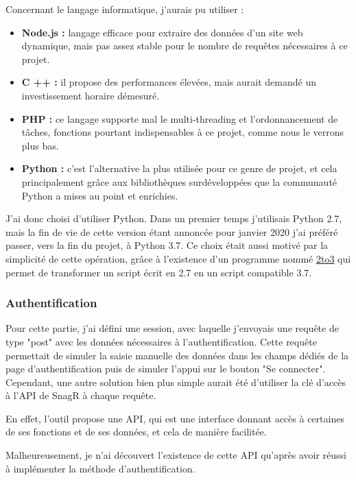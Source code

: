 Concernant le langage informatique, j'aurais pu utiliser :
\begin{itemize}
\item \textbf{Node.js :} langage efficace pour extraire des données d'un site web dynamique, mais pas assez stable pour le nombre de requêtes nécessaires à ce projet.
\item \textbf{C ++ :} il propose des performances élevées, mais aurait demandé un investissement horaire démesuré.
\item \textbf{PHP :} ce langage supporte mal le multi-threading et l'ordonnancement de tâches, fonctions pourtant indispensables à ce projet, comme nous le verrons plus bas.
\item \textbf{Python :} c'est l'alternative la plus utilisée pour ce genre de projet, et cela principalement grâce aux bibliothèques surdéveloppées que la communauté Python a mises au point et enrichies.
\end{itemize}

J'ai donc choisi d'utiliser Python. Dans un premier temps j'utilisais Python 2.7, mais la fin de vie de cette version étant annoncée pour janvier 2020 j'ai préféré passer, vers la fin du projet, à Python 3.7.
Ce choix était aussi motivé par la simplicité de cette opération, grâce à l'existence d'un programme nommé \underline{\href{https://docs.python.org/2/library/2to3.html}{2to3}} qui permet de transformer un script écrit en 2.7 en un script compatible 3.7.

\subsubsection{Authentification}

Pour cette partie, j'ai défini une session, avec laquelle j'envoyais une requête de type "post" avec les données nécessaires à l'authentification. Cette requête permettait de simuler la saisie manuelle des données dans les champs dédiés de la page d'authentification puis de simuler l'appui sur le bouton "Se connecter".
Cependant, une autre solution bien plus simple aurait été d'utiliser la clé d'accès à l'\gls{API} de \gls{SnagR} à chaque requête.

En effet, l'outil propose une \gls{API}, qui est une interface donnant accès à certaines de ses fonctions et de ses données, et cela de manière facilitée.

Malheureusement, je n'ai découvert l'existence de cette \gls{API} qu'après avoir réussi à implémenter la méthode d'authentification.

